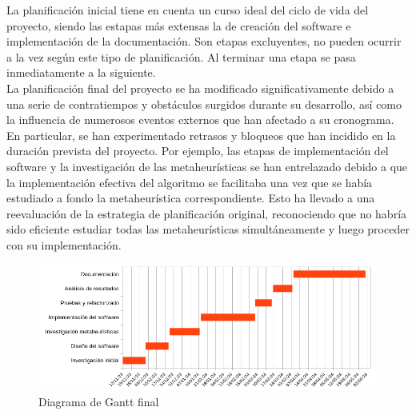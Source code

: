 La planificación inicial tiene en cuenta un curso ideal del ciclo de vida del proyecto, siendo las estapas más extensas la de creación del software e implementación de la documentación. Son etapas excluyentes, no pueden ocurrir a la vez según este tipo de planificación. Al terminar una etapa se pasa inmediatamente a la siguiente.\\[6pt]
La planificación final del proyecto se ha modificado significativamente debido a una serie de contratiempos y obstáculos surgidos durante su desarrollo, así como la influencia de numerosos eventos externos que han afectado a su cronograma. En particular, se han experimentado retrasos y bloqueos que han incidido en la duración prevista del proyecto. Por ejemplo, las etapas de implementación del software y la investigación de las metaheurísticas se han entrelazado debido a que la implementación efectiva del algoritmo se facilitaba una vez que se había estudiado a fondo la metaheurística correspondiente. Esto ha llevado a una reevaluación de la estrategia de planificación original, reconociendo que no habría sido eficiente estudiar todas las metaheurísticas simultáneamente y luego proceder con su implementación.

\begin{figure}[H]
      \begin{center}
      \includegraphics[width=1.2\textwidth]{imagenes/gantt-init.png}
      \end{center}
      \caption{Diagrama de Gantt final}
\end{figure}

